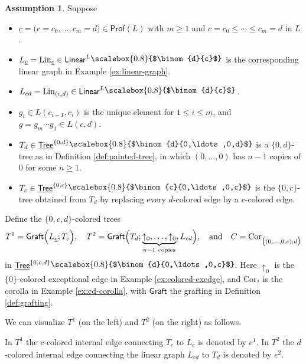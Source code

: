 \documentclass[11pt]{amsbook}
\numberwithin{section}{chapter}
\numberwithin{subsection}{section}
\numberwithin{equation}{section}
\theoremstyle{plain}
\theoremstyle{definition}
\newtheorem{assumption}[equation]{Assumption}
\newcommand{\Cor}{\mathrm{Cor}}
\newcommand{\graft}{\mathsf{Graft}}
\newcommand{\Lin}{\mathrm{Lin}}
\newcommand{\Prof}{\mathsf{Prof}}
\newcommand{\profl}{\Prof(L)}
\newcommand{\zeroc}{\{0,c\}}
\newcommand{\zerod}{\{0,d\}}
\newcommand{\zerocd}{\{0,c,d\}}
\newcommand{\Linear}{\mathsf{Linear}}
\newcommand{\Tree}{\mathsf{Tree}}
\newcommand{\uTree}{\underline{\Tree}}
\newcommand{\uTreezeroc}{\uTree^{\zeroc}}
\newcommand{\uTreezerod}{\uTree^{\zerod}}
\newcommand{\uTreezerocd}{\uTree^{\zerocd}}
\newcommand{\uc}{\underline c}
\newcommand{\smallprof}[1]
{\raisebox{.05cm}{\scalebox{0.8}{#1}}}
\newcommand{\czerozeroc}{\smallprof{$\binom{c}{0,\ldots,0,c}$}}
\newcommand{\dc}{\smallprof{$\binom{d}{c}$}}
\newcommand{\dzerozeroc}{\smallprof{$\binom{d}{0,\ldots,0,c}$}}
\newcommand{\dzerozerod}{\smallprof{$\binom{d}{0,\ldots,0,d}$}}
\newcommand{\andspace}{\quad\text{and}\quad}
\begin{document}
\begin{assumption}\label{assumption:hpa-hcdiag-mod}
Suppose 
\begin{itemize}\item $\uc = \bigl(c=c_0,\ldots,c_m=d\bigr) \in \profl$ with $m \geq 1$ and $c=c_0 \leq \cdots \leq c_m=d$ in $L$.
\item $L_{\uc}=\Lin_{\uc} \in \Linear^L\dc$ is the corresponding linear graph in Example \ref{ex:linear-graph}. 
\item $L_{cd} = \Lin_{(c,d)} \in \Linear^L \dc$.
\item $g_i \in L(c_{i-1},c_i)$ is the unique element for $1 \leq i \leq m$, and $g = g_m \cdots g_1 \in L(c,d)$.
\item $T_d \in \uTreezerod\dzerozerod$ is a $\zerod$-tree as in Definition \ref{def:painted-tree}, in which $(0,\ldots,0)$ has $n-1$ copies of $0$ for some $n \geq 1$.
\item $T_c\in \uTreezeroc\czerozeroc$ is the $\zeroc$-tree obtained from $T_d$ by replacing every $d$-colored edge by a $c$-colored edge.  
\end{itemize}
Define the $\zerocd$-colored trees
\[T^1 = \graft\Bigl(L_{\uc};T_c\Bigr), \quad 
T^2 = \graft\Bigl(T_d; \underbrace{\uparrow_0,\ldots,\uparrow_0}_{n-1~ \mathrm{copies}},L_{cd}\Bigr), \andspace C = \Cor_{\bigl((0,\ldots,0,c);d\bigr)}\]
in $\uTreezerocd\dzerozeroc$.  Here $\uparrow_0$ is the $\{0\}$-colored exceptional edge in Example \ref{ex:colored-exedge}, and $\Cor_?$ is the corolla in Example \ref{ex:cd-corolla}, with $\graft$ the grafting in Definition \ref{def:grafting}.  

We can visualize $T^1$ (on the left) and $T^2$ (on the right) as follows.
\begin{center}
\end{center}
In $T^1$ the $c$-colored internal edge connecting $T_c$ to $L_{\uc}$ is denoted by $e^1$.  In $T^2$ the $d$-colored internal edge connecting the linear graph $L_{cd}$ to $T_d$ is denoted by $e^2$.


\end{assumption}
\end{document}
